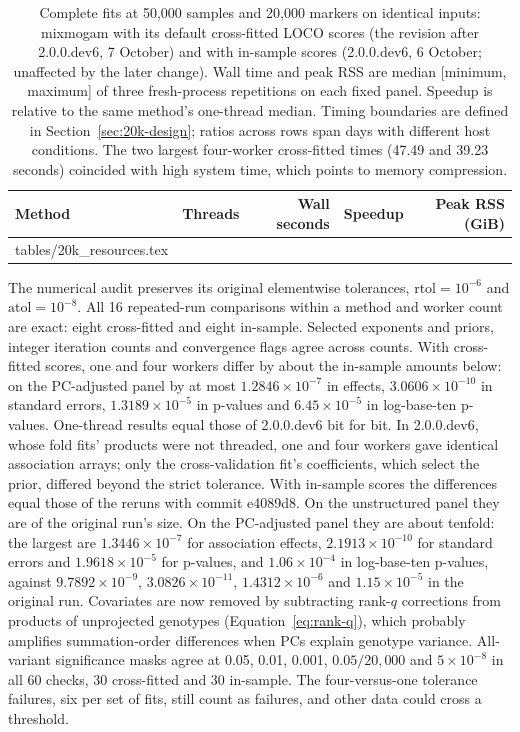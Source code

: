 \documentclass[11pt]{article}
\makeatletter
\newcommand{\tabinput}[1]{\@@input #1 }
\makeatother
\begin{document}
\begin{table}[htbp]
 \centering\small
 \caption{Complete fits at 50,000 samples and 20,000 markers on identical
 inputs: mixmogam with its default cross-fitted LOCO scores (the revision
 after 2.0.0.dev6, 7 October) and with in-sample scores (2.0.0.dev6,
 6 October; unaffected by the later change). Wall time and peak RSS are median [minimum, maximum]
 of three fresh-process repetitions on each fixed panel. Speedup is
 relative to the same method's one-thread median. Timing boundaries
 are defined in Section~\ref{sec:20k-design}; ratios across rows span
 days with different host conditions. The two largest four-worker
 cross-fitted times (47.49 and 39.23 seconds) coincided with high system
 time, which points to memory compression.}
 \label{tab:20k-resources}
 \begin{tabular}{@{}lrrrr@{}}
 \toprule
 Method & Threads & Wall seconds & Speedup & Peak RSS (GiB) \\
 \midrule
 \tabinput{tables/20k_resources.tex}
 \bottomrule
 \end{tabular}
\end{table}

The numerical audit preserves its original elementwise tolerances,
$\mathrm{rtol}=10^{-6}$ and $\mathrm{atol}=10^{-8}$. All 16 repeated-run
comparisons within a method and worker count are exact: eight cross-fitted
and eight in-sample. Selected exponents and priors, integer
iteration counts and convergence flags agree across counts. With
cross-fitted scores, one and four workers differ by about the in-sample
amounts below: on the PC-adjusted panel by at most $1.2846\times10^{-7}$ in
effects, $3.0606\times10^{-10}$ in standard errors, $1.3189\times10^{-5}$
in p-values and $6.45\times10^{-5}$ in log-base-ten p-values. One-thread
results equal those of 2.0.0.dev6 bit for bit. In 2.0.0.dev6, whose fold
fits' products were not threaded, one and four workers gave identical
association arrays; only the cross-validation fit's coefficients, which
select the prior, differed beyond the strict tolerance.
With in-sample scores the differences equal those of the reruns with commit
e4089d8. On the unstructured panel they are of the original run's size. On
the PC-adjusted panel they are about tenfold: the largest are
$1.3446\times10^{-7}$ for association effects, $2.1913\times10^{-10}$ for
standard errors and $1.9618\times10^{-5}$ for p-values, and
$1.06\times10^{-4}$ in log-base-ten p-values, against
$9.7892\times10^{-9}$, $3.0826\times10^{-11}$, $1.4312\times10^{-6}$ and
$1.15\times10^{-5}$ in the original run. Covariates are now removed by subtracting
rank-$q$ corrections from products of unprojected genotypes
(Equation~\eqref{eq:rank-q}), which probably amplifies summation-order
differences when PCs explain genotype variance. All-variant significance
masks agree at 0.05, 0.01, 0.001, $0.05/20{,}000$ and $5\times10^{-8}$
in all 60 checks, 30 cross-fitted and 30 in-sample. The four-versus-one
tolerance failures, six per set of fits, still count as failures, and other
data could cross a threshold.
\end{document}
